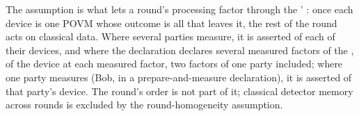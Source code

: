 
The assumption is what lets a round's processing factor through the
' : once each device is one
POVM whose outcome is all that leaves it, the rest of the round acts on
classical data. Where several parties measure, it is asserted of each of
their devices, and where the declaration declares several measured factors
of the , of the device at each measured factor, two
factors of one party included; where one party
measures (Bob, in a prepare-and-measure declaration), it is asserted of that
party's device. The round's order is
not part of it; classical detector memory across rounds is excluded by the
round-homogeneity assumption.

